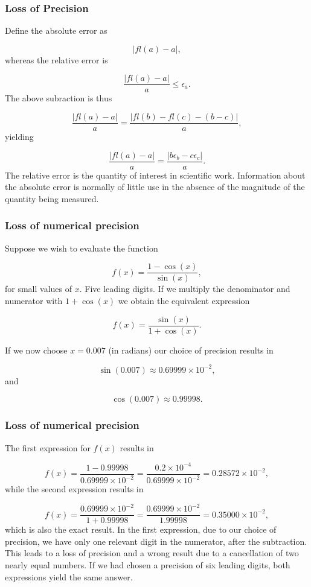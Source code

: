 \documentclass[handout]{beamer}
\newenvironment{block_mdfboxadmon}[1][]{\begin{block}{#1}}{\end{block}}
\begin{document}
\begin{frame}
\frametitle{Loss of Precision}

\begin{block_mdfboxadmon}
Define
the absolute error as

\begin{equation}
   |fl(a)-a|,
\end{equation}
whereas the relative error is

\begin{equation}
   \frac{ |fl(a)-a|}{a} \le \epsilon_a.
\end{equation}
The above subraction is thus

\begin{equation}
   \frac{ |fl(a)-a|}{a}=\frac{ |fl(b)-fl(c)-(b-c)|}{a},
\end{equation}
yielding

\begin{equation}
   \frac{ |fl(a)-a|}{a}=\frac{ |b\epsilon_b- c\epsilon_c|}{a}.
\end{equation}
The relative error
is the quantity of interest in scientific work. Information about the
absolute error is normally of little use in the absence of the magnitude
of the quantity being measured.
\end{block_mdfboxadmon}
\end{frame}

\begin{frame}
\frametitle{Loss of numerical precision}

Suppose we wish to evaluate the function

\[
   f(x)=\frac{1-\cos(x)}{\sin(x)},
\]
for small values of $x$. Five leading digits. If we multiply the denominator and numerator
with $1+\cos(x)$ we obtain the equivalent expression

\[
   f(x)=\frac{\sin(x)}{1+\cos(x)}.
\]

If we now choose $x=0.007$ (in radians) our choice of precision results in

\[
   \sin(0.007)\approx 0.69999\times 10^{-2},
\]
and

\[
   \cos(0.007)\approx 0.99998.
\]
\end{frame}

\begin{frame}
\frametitle{Loss of numerical precision}

The first expression for $f(x)$ results in

\[
   f(x)=\frac{1-0.99998}{0.69999\times 10^{-2}}=\frac{0.2\times 10^{-4}}{0.69999\times 10^{-2}}=0.28572\times 10^{-2},
\]
while the second expression results in

\[
   f(x)=\frac{0.69999\times 10^{-2}}{1+0.99998}=
\frac{0.69999\times 10^{-2}}{1.99998}=0.35000\times 10^{-2},
\]
which is also the exact result. In the first expression, due to our
choice of precision, we have
only one relevant digit in the numerator, after the
subtraction. This leads to a loss of precision and a wrong result due to
a cancellation of two nearly equal numbers.
If we had chosen a precision of six leading digits, both expressions
yield the same answer.
\end{frame}
\end{document}
